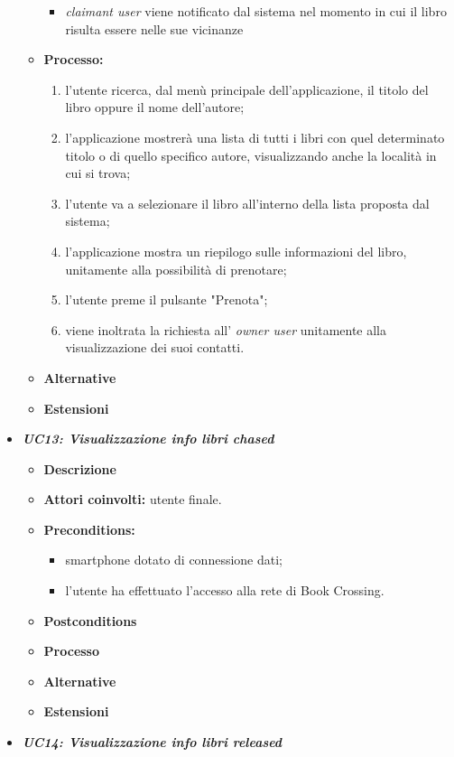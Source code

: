 \begin{itemize}
\begin{itemize}
\begin{itemize}
			\item \textit{claimant user} viene notificato dal sistema nel momento in cui il libro risulta essere nelle sue vicinanze
		\end{itemize}
		\item \textbf{Processo:}
		\begin{enumerate}
			\item l'utente ricerca, dal menù principale dell'applicazione, il titolo del libro oppure il nome dell'autore;
			\item l'applicazione mostrerà una lista di tutti i libri con quel determinato titolo o di quello specifico autore, visualizzando anche la località in cui si trova;
			\item l'utente va a selezionare il libro all'interno della lista proposta dal sistema;
			\item l'applicazione mostra un riepilogo sulle informazioni del libro, unitamente alla possibilità di prenotare;
			\item l'utente preme il pulsante "Prenota";
			\item viene inoltrata la richiesta all' \textit{owner user} unitamente alla visualizzazione dei suoi contatti.
		\end{enumerate}
		\item \textbf{Alternative}
		\item \textbf{Estensioni}
	\end{itemize}
	\item \textbf{\textit{UC13: Visualizzazione info libri chased}}
	\begin{itemize}
		\item \textbf{Descrizione}
		\item \textbf{Attori coinvolti:} utente finale.
		\item \textbf{Preconditions:}
		\begin{itemize}
			\item smartphone dotato di connessione dati;
			\item l’utente ha effettuato l’accesso alla rete di Book Crossing.
		\end{itemize}
		\item \textbf{Postconditions}
		\item \textbf{Processo}
		\item \textbf{Alternative}
		\item \textbf{Estensioni}
	\end{itemize}
	\item \textbf{\textit{UC14: Visualizzazione info libri released}}

\end{itemize}
